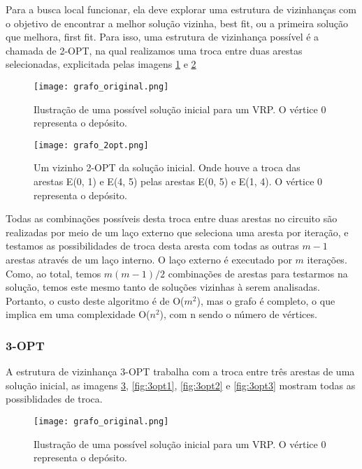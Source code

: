 \documentclass[12pt, a4paper]{article}
\begin{document}
Para a busca local funcionar, ela deve explorar uma estrutura de vizinhanças com o objetivo de encontrar a melhor solução vizinha, best fit, ou a primeira solução que melhora, first fit. Para isso, uma estrutura de vizinhança possível é a chamada de 2-OPT, na qual realizamos uma troca entre duas arestas selecionadas, explicitada pelas imagens \ref{fig:org} e \ref{fig:2-opt}

\begin{figure}[htb!]
\centering
\texttt{[image: grafo\_original.png]}
\caption{Ilustração de uma possível solução inicial para um VRP. O vértice 0 representa o depósito.}
\label{fig:org}
\end{figure}

\begin{figure}[htb!]
\centering
\texttt{[image: grafo\_2opt.png]}
\caption{Um vizinho 2-OPT da solução inicial. Onde houve a troca das arestas E(0, 1) e E(4, 5) pelas arestas E(0, 5) e E(1, 4). O vértice 0 representa o depósito.}
\label{fig:2-opt}
\end{figure}

Todas as combinações possíveis desta troca entre duas arestas no circuito são realizadas por meio de um laço externo que seleciona uma aresta por iteração, e testamos as possibilidades de troca desta aresta com todas as outras $m - 1$ arestas através de um laço interno. O laço externo é executado por $m$ iterações. Como, ao total, temos $m(m - 1)/2$ combinações de arestas para testarmos na solução, temos este mesmo tanto de soluções vizinhas à serem analisadas. Portanto, o custo deste algoritmo é de O($m^2$), mas o grafo é completo, o que implica em uma complexidade O($n^2$), com n sendo o número de vértices.


\subsubsection{3-OPT}

A estrutura de vizinhança 3-OPT trabalha com a troca entre três arestas de uma solução inicial, as imagens \ref{fig:org2}, \ref{fig:3opt1}, \ref{fig:3opt2} e \ref{fig:3opt3}  mostram todas as possiblidades de troca.

\begin{figure}[htb!]
\centering
\texttt{[image: grafo\_original.png]}
\caption{Ilustração de uma possível solução inicial para um VRP. O vértice 0 representa o depósito.}
\label{fig:org2}
\end{figure}
\end{document}
